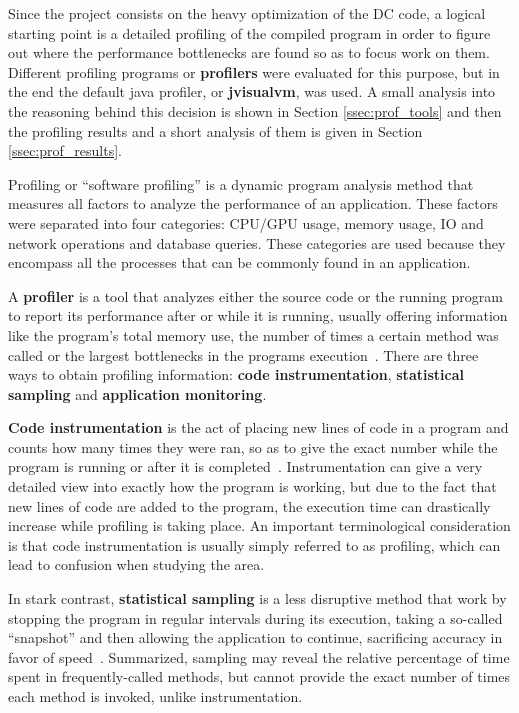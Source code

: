 Since the project consists on the heavy optimization of the DC code, a logical starting point is a detailed profiling of the compiled program in order to figure out where the performance bottlenecks are found so as to focus work on them. %
Different profiling programs or \textbf{profilers} were evaluated for this purpose, but in the end the default java profiler, or \textbf{jvisualvm}, was used.
A small analysis into the reasoning behind this decision is shown in Section \ref{ssec:prof_tools} and then the profiling results and a short analysis of them is given in Section \ref{ssec:prof_results}.

Profiling or ``software profiling'' is a dynamic program analysis method that measures all factors to analyze the performance of an application.
These factors were separated into four categories: CPU/GPU usage, memory usage, IO and network operations and database queries.
These categories are used because they encompass all the processes that can be commonly found in an application.

A \textbf{profiler} is a tool that analyzes either the source code or the running program to report its performance after or while it is running, usually offering information like the program's total memory use, the number of times a certain method was called or the largest bottlenecks in the programs execution~\cite{ball1997efficient}.
There are three ways to obtain profiling information: \textbf{code instrumentation}, \textbf{statistical sampling} and \textbf{application monitoring}.

\textbf{Code instrumentation} is the act of placing new lines of code in a program and counts how many times they were ran, so as to give the exact number while the program is running or after it is completed~\cite{ball1994optimally}.
Instrumentation can give a very detailed view into exactly how the program is working, but due to the fact that new lines of code are added to the program, the execution time can drastically increase while profiling is taking place.
An important terminological consideration is that code instrumentation is usually simply referred to as profiling, which can lead to confusion when studying the area. %

In stark contrast, \textbf{statistical sampling} is a less disruptive method that work by stopping the program in regular intervals during its execution, taking a so-called ``snapshot'' and then allowing the application to continue, sacrificing accuracy in favor of speed~\cite{wenisch2006simflex}.
Summarized, sampling may reveal the relative percentage of time spent in frequently-called methods, but cannot provide the exact number of times each method is invoked, unlike instrumentation.

